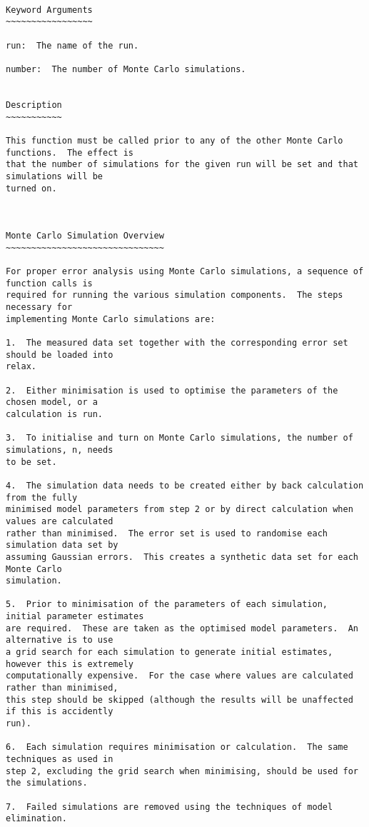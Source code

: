 {\scriptsize
\begin{verbatim}

Keyword Arguments
~~~~~~~~~~~~~~~~~

run:  The name of the run.

number:  The number of Monte Carlo simulations.


Description
~~~~~~~~~~~

This function must be called prior to any of the other Monte Carlo functions.  The effect is
that the number of simulations for the given run will be set and that simulations will be
turned on.



Monte Carlo Simulation Overview
~~~~~~~~~~~~~~~~~~~~~~~~~~~~~~~

For proper error analysis using Monte Carlo simulations, a sequence of function calls is
required for running the various simulation components.  The steps necessary for
implementing Monte Carlo simulations are:

1.  The measured data set together with the corresponding error set should be loaded into
relax.

2.  Either minimisation is used to optimise the parameters of the chosen model, or a
calculation is run.

3.  To initialise and turn on Monte Carlo simulations, the number of simulations, n, needs
to be set.

4.  The simulation data needs to be created either by back calculation from the fully
minimised model parameters from step 2 or by direct calculation when values are calculated
rather than minimised.  The error set is used to randomise each simulation data set by
assuming Gaussian errors.  This creates a synthetic data set for each Monte Carlo
simulation.

5.  Prior to minimisation of the parameters of each simulation, initial parameter estimates
are required.  These are taken as the optimised model parameters.  An alternative is to use
a grid search for each simulation to generate initial estimates, however this is extremely
computationally expensive.  For the case where values are calculated rather than minimised,
this step should be skipped (although the results will be unaffected if this is accidently
run).

6.  Each simulation requires minimisation or calculation.  The same techniques as used in
step 2, excluding the grid search when minimising, should be used for the simulations.

7.  Failed simulations are removed using the techniques of model elimination.


\end{verbatim}}
